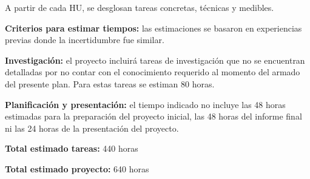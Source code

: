 \documentclass[
11pt, %
]{charter}
\begin{document}
A partir de cada HU, se desglosan tareas concretas, técnicas y medibles.

\textbf{Criterios para estimar tiempos:} las estimaciones se basaron en experiencias previas donde la incertidumbre fue similar.

\textbf{Investigación:} el proyecto incluirá tareas de investigación que no se encuentran detalladas por no contar con el conocimiento requerido al momento del armado del presente plan. Para estas tareas se estiman 80 horas.

\textbf{Planificación y presentación:} el tiempo indicado no incluye las 48 horas estimadas para la preparación del proyecto inicial, las 48 horas del informe final ni las 24 horas de la presentación del proyecto.

\textbf{Total estimado tareas:} 440 horas

\textbf{Total estimado proyecto:} 640 horas
\end{document}
